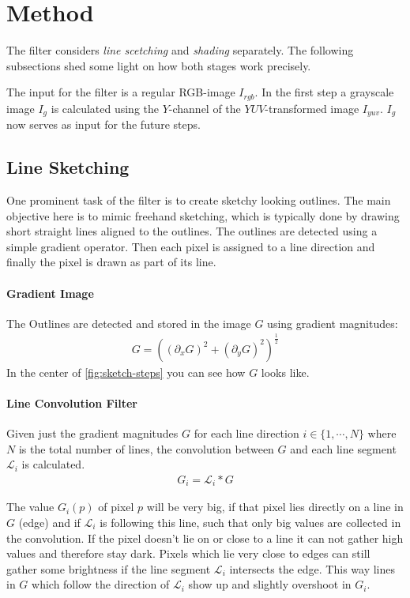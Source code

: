 \section{Method} \label{method}
The filter considers \textit{line scetching} and \textit{shading} separately.
The following subsections shed some light on how both stages work precisely.

The input for the filter is a regular RGB-image $I_{rgb}$. In the first step a
grayscale image $I_g$ is calculated using the $Y$-channel of the
$YUV$-transformed image $I_{yuv}$. $I_g$ now serves as input for the future
steps.

\subsection{Line Sketching}
One prominent task of the filter is to create sketchy looking outlines. The main
objective here is to mimic freehand sketching, which is typically done by
drawing short straight lines aligned to the outlines. The outlines are detected
using a simple gradient operator. Then each pixel is assigned to a line
direction and finally the pixel is drawn as part of its line.

\paragraph{Gradient Image}
The Outlines are detected and stored in the image $G$ using gradient magnitudes:
\begin{align*}
  G = ((\partial_x G)^2 + (\partial_y G)^2)^{\frac{1}{2}}
\end{align*}
In the center of \autoref{fig:sketch-steps} you can see how $G$ looks like.

\paragraph{Line Convolution Filter}
Given just the gradient magnitudes $G$ for each line direction $i \in
\lbrace 1,\cdots,N\rbrace$ where $N$ is the total number of lines, the convolution between
$G$ and each line segment $\mathscr{L}_i$ is calculated.
\begin{align*}
  G_i = \mathscr{L}_i * G
\end{align*}

The value $G_i(p)$ of pixel $p$ will be very big, if that pixel lies directly on
a line in $G$ (edge) and if $\mathscr{L}_i$ is following this line, such that only big
values are collected in the convolution. If the pixel doesn't lie on or close to
a line it can not gather high values and therefore stay dark. Pixels which lie
very close to edges can still gather some brightness if the
line segment $\mathscr{L}_i$ intersects the edge. This way lines in $G$ which
follow the direction of $\mathscr{L}_i$ show up and slightly overshoot in $G_i$.

